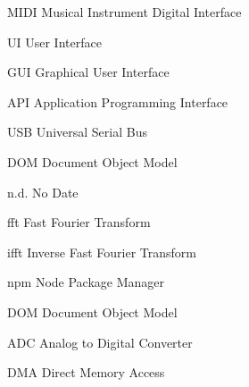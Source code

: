 \begin{acronyms}
  \item[MIDI] Musical Instrument Digital Interface
  \item[UI] User Interface
  \item[GUI] Graphical User Interface
  \item[API] Application Programming Interface
  \item[USB] Universal Serial Bus
  \item[DOM] Document Object Model
  \item[n.d.] No Date
  \item[fft] Fast Fourier Transform
  \item[ifft] Inverse Fast Fourier Transform
  \item[npm] Node Package Manager
  \item[DOM] Document Object Model
  \item[ADC] Analog to Digital Converter
  \item[DMA] Direct Memory Access
\end{acronyms}
